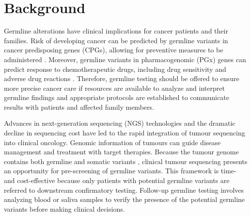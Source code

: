 \documentclass{bmcart}
\begin{document}


\section*{Background}

Germline alterations have clinical implications for cancer patients and their families. Risk of developing cancer can be predicted by germline variants in cancer predisposing genes (CPGs), allowing for preventive measures to be administered \cite{Rahman2014}. Moreover, germline variants in pharmacogenomic (PGx) genes can predict response to chemotherapeutic drugs, including drug sensitivity and adverse drug reactions \cite{Panczyk2014, Mohelnikova-Duchonova2014}. Therefore, germline testing should be offered to ensure more precise cancer care if resources are available to analyze and interpret germline findings and appropriate protocols are established to communicate results with patients and affected family members.

Advances in next-generation sequencing (NGS) technologies and the dramatic decline in sequencing cost \cite{Wetterstrand2016} have led to the rapid integration of tumour sequencing into clinical oncology. Genomic information of tumours can guide disease management and treatment with target therapies. Because the tumour genome contains both germline and somatic variants \cite{Schrader2015, Jones2015a, Meric-Bernstam2016, Bombard2014, WcWhinney2009}, clinical tumour sequencing presents an opportunity for pre-screening of germline variants. This framework is time- and cost-effective because only patients with potential germline variants are referred to downstream confirmatory testing. Follow-up germline testing involves analyzing blood or saliva samples to verify the presence of the potential germline variants before making clinical decisions.
\end{document}
